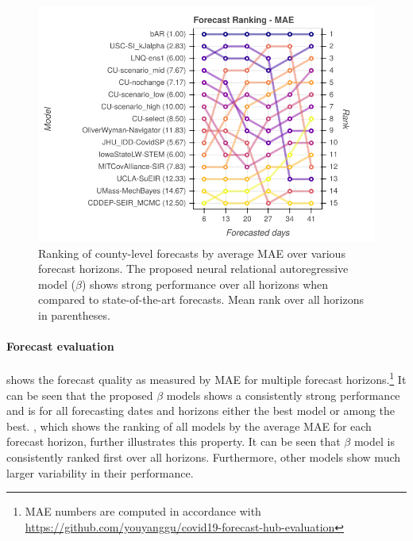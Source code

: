 \documentclass{article}
\newcommand{\bAR}{\ensuremath{\beta}\text{-AR}\xspace}
\begin{document}
\begin{figure}[t]
  \centering
  \includegraphics[width=\columnwidth]{img/us_rank_mae.png}
  \vspace{-2ex}
\caption{Ranking of county-level forecasts by average MAE over various forecast horizons. The proposed neural relational autoregressive model (\bAR) shows strong performance over all horizons when compared to state-of-the-art forecasts. Mean rank over all horizons in parentheses.}
\label{fig:ranking-covidhub-mae}
\end{figure}



\paragraph{Forecast evaluation}  shows the forecast
quality as measured by MAE for multiple forecast horizons.\footnote{MAE numbers are computed in accordance with \url{https://github.com/youyanggu/covid19-forecast-hub-evaluation}} It can be seen that
the proposed \bAR models shows a consistently strong performance and is for all
forecasting dates and horizons either the best model or among the best.
, which shows the ranking of all models by the
average MAE for each forecast horizon, further illustrates this property. It can
be seen that \bAR model is consistently ranked first over all horizons.
Furthermore, other models show much larger variability in their performance.
\end{document}
